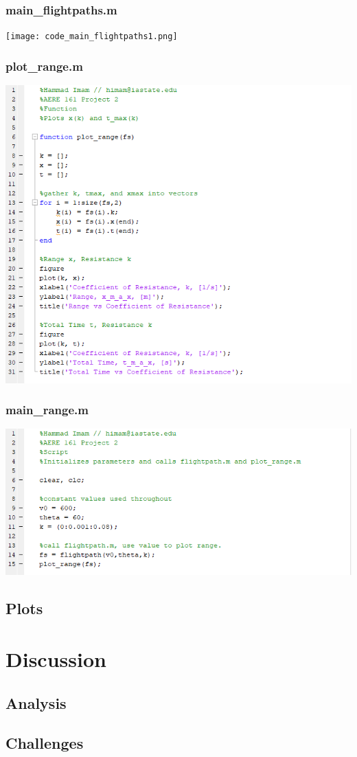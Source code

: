 \documentclass{article}
\begin{document}
\subsubsection{main_flightpaths.m}
\texttt{[image: code\_main\_flightpaths1.png]}
\subsubsection{plot_range.m}
\includegraphics [width=\linewidth]{code_plot_range.png}
\subsubsection{main_range.m}
\includegraphics [width=\linewidth]{code_main_range.png}
\subsection{Plots}
\subsection{}


\newpage
\section{Discussion}
\subsection{Analysis}
\subsection{Challenges}
\end{document}
